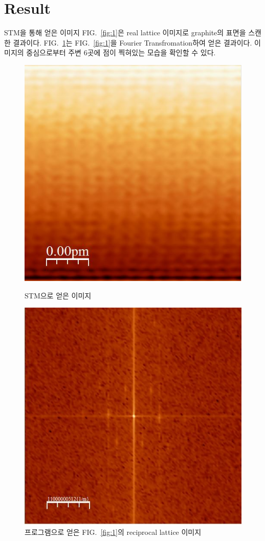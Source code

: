 \documentclass[aps,reprint,superscriptaddress,11pt]{revtex4-2}
\begin{document}
\section{Result}
STM을 통해 얻은 이미지 FIG.~\ref{fig:1}은 real lattice 이미지로 graphite의 표면을 스캔한 
결과이다. FIG.~\ref{fig:2}는 
FIG.~\ref{fig:1}을 Fourier Transfromation하여 얻은 결과이다. 이미지의 중심으로부터 주변 6곳에 
점이 찍혀있는 모습을 확인할 수 있다. 
\begin{figure}[htp]
  \centering
  \includegraphics[scale=0.5]{fig1.jpg}
  \caption{STM으로 얻은 이미지}
  \label{fig:1}
  \includegraphics[scale=0.5]{fig2.jpg}
  \caption{프로그램으로 얻은 FIG.~\ref{fig:1}의 reciprocal lattice 이미지}
  \label{fig:2}
\end{figure}
\end{document}
